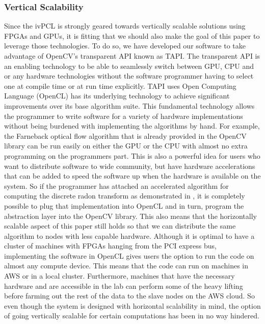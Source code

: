 \subsubsection{\label{subsubsection:opencv_tapi}Vertical Scalability}
Since the ivPCL is strongly geared towards vertically scalable solutions using
FPGAs and GPUs, it is fitting that we should also make the goal of this paper
to leverage those technologies. To do so, we have developed our software to take
advantage of OpenCV's transparent API known as TAPI. The transparent API is an
enabling technology to be able to seamlessly switch between GPU, CPU and or any
hardware technologies without the software programmer having to select one at
compile time or at run time explicitly. TAPI uses Open Computing Language
(OpenCL) has its underlying technology to achieve significant improvements over
its base algorithm suite. This fundamental technology allows the programmer to
write software for a variety of hardware implementations without being burdened
with implementing the algorithms by hand. For example, the Farneback optical
flow algorithm that is already provided in the OpenCV library can be run easily
on either the GPU or the CPU with almost no extra programming on the programmers
part. This is also a powerful idea for users who want to distribute software to
wide community, but have hardware accelerations that can be added to speed the
software up when the hardware is available on the system. So if the programmer
has attached an accelerated algorithm for computing the discrete radon transform
as demonstrated in \cite{Cesar2014a}, it is completely possible to plug that
implementation into OpenCL and in turn, program the abstraction layer into the
OpenCV library. This also means that the horizontally scalable aspect of this
paper still holds so that we can distribute the same algorithm to nodes with
less capable hardware. Although it is optimal to have a cluster of machines with
FPGAs hanging from the PCI express bus, implementing the software in OpenCL
gives users the option to run the code on almost any compute device. This means
that the code can run on machines in AWS or in a local cluster. Furthermore,
machines that have the necessary hardware and are accessible in the lab can
perform some of the heavy lifting before farming out the rest of the data to the
slave nodes on the AWS cloud. So even though the system is designed with
horizontal scalability in mind, the option of going vertically scalable for
certain computations has been in no way hindered.


